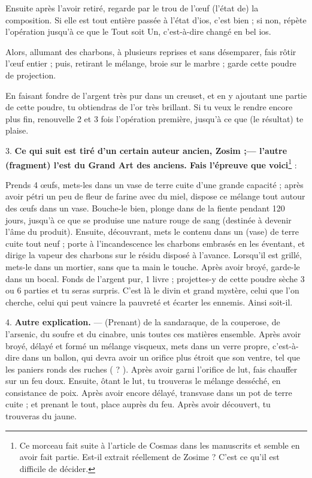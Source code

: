 \documentclass[a4paper, 11pt, oneside, polutonikogreek, french]{article}
\begin{document}
Ensuite après l'avoir retiré, regarde par le trou de l'œuf (l'état de) la composition. Si elle est tout entière passée à l'état d'ios, c'est bien ; si non, répète l'opération jusqu'à ce que le Tout soit Un, c'est-à-dire changé en bel ios.

Alors, allumant des charbons, à plusieurs reprises et sans désemparer, fais rôtir l'œuf entier ; puis, retirant le mélange, broie sur le marbre ; garde cette poudre de projection.

En faisant fondre de l'argent très pur dans un creuset, et en y ajoutant une partie de cette poudre, tu obtiendras de l'or très brillant. Si tu veux le rendre encore plus fin, renouvelle 2 et 3 fois l'opération première, jusqu'à ce que (le résultat) te plaise.

3. \textbf{Ce qui suit est tiré d'un certain auteur ancien, Zosim ;--- l'autre (fragment) l'est du Grand Art des anciens. Fais l'épreuve que voici}\footnote{Ce morceau fait suite à l'article de Cosmas dans les manuscrits et semble en avoir fait partie. Est-il extrait réellement de Zosime ? C'est ce qu'il est difficile de décider.} :

Prends 4 œufs, mets-les dans un vase de terre cuite d'une grande capacité ; après avoir pétri un peu de fleur de farine avec du miel, dispose ce mélange tout autour des œufs dans un vase. Bouche-le bien, plonge dans de la fiente pendant 120 jours, jusqu'à ce que se produise une nature rouge de sang (destinée à devenir l'âme du produit). Ensuite, découvrant, mets le contenu dans un (vase) de terre cuite tout neuf ; porte à l'incandescence les charbons embrasés en les éventant, et dirige la vapeur des charbons sur le résidu disposé à l'avance. Lorsqu'il est grillé, mets-le dans un mortier, sans que ta main le touche. Après avoir broyé, garde-le dans un bocal. Fonds de l'argent pur, 1 livre ; projettes-y de cette poudre sèche 3 ou 6 parties et tu seras surpris. C'est là le divin et grand mystère, celui que l'on cherche, celui qui peut vaincre la pauvreté et écarter les ennemis. Ainsi soit-il.

4. \textbf{Autre explication.} --- (Prenant) de la sandaraque, de la couperose, de l'arsenic, du soufre et du cinabre, unis toutes ces matières ensemble. Après avoir broyé, délayé et formé un mélange visqueux, mets dans un verre propre, c'est-à-dire dans un ballon, qui devra avoir un orifice plus étroit que son ventre, tel que les paniers ronds des ruches ( ? ). Après avoir garni l'orifice de lut, fais chauffer sur un feu doux. Ensuite, ôtant le lut, tu trouveras le mélange desséché, en consistance de poix. Après avoir encore délayé, transvase dans un pot de terre cuite ; et prenant le tout, place auprès du feu. Après avoir découvert, tu trouveras du jaune.
\end{document}
